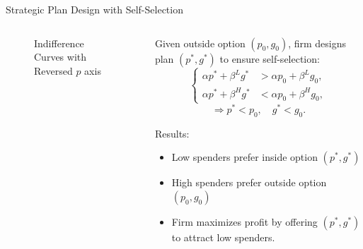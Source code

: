\documentclass[professionalfonts, aspectratio=169]{beamer}
\begin{document}
\begin{frame}{Strategic Plan Design with Self-Selection}
  \begin{columns}
    \begin{column}{0.5\textwidth}
      \begin{figure}
        \centering
        \caption{\footnotesize
          Indifference Curves with Reversed \( p \) axis}
        \label{fig:indifference_curves}
      \end{figure}
    \end{column}
    \begin{column}{0.5\textwidth}
      
      Given outside option \((p_0, g_0)\), firm designs plan \((p^*, g^*)\) to ensure self-selection:
      \[
      \left\{
      \begin{aligned}
      \alpha p^* + \beta^L g^* &> \alpha p_0 + \beta^L g_0, \\
      \alpha p^* + \beta^H g^* &< \alpha p_0 + \beta^H g_0,
      \end{aligned}
      \right.
      \]
      $$ \Rightarrow p^* < p_0, \quad g^* < g_0. $$

      Results:
      \begin{itemize}\small
        \item Low spenders prefer inside option $(p^*, g^*)$
        \item High spenders prefer outside option $(p_0, g_0)$
        \item Firm maximizes profit by offering $(p^*, g^*)$ to attract low spenders.
      \end{itemize}
    \end{column}
  \end{columns}
\end{frame}
\end{document}
